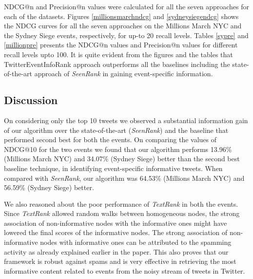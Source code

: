 NDCG@n and Precision@n values were calculated for all the seven approaches for each of the datasets. Figures \ref{millionsmarchndcg} and \ref{sydneysiegendcg} shows the NDCG curves for all the seven approaches on the Millions March NYC and the Sydney Siege events, respectively, for up-to 20 recall levels. Tables \ref{sypre} and \ref{millionpre} presents the NDCG@n values and Precision@n values for different recall levels upto 100. It is quite evident from the figures and the tables that TwitterEventInfoRank approach outperforms all the baselines including the state-of-the-art approach of \textit{SeenRank} in gaining event-specific information.



%




\subsection{Discussion}
On considering only the top 10 tweets we observed a substantial information gain of our algorithm over the state-of-the-art (\textit{SeenRank}) and the baseline that performed second best for both the events. On comparing the values of NDCG@10 for the two events we found that our algorithm performs 13.96\% (Millions March NYC) and 34.07\% (Sydney Siege) better than the second best baseline technique, in identifying event-specific informative tweets. When compared with \textit{SeenRank}, our algorithm was 64.53\% (Millions March NYC) and 56.59\% (Sydney Siege) better. 

We also reasoned about the poor performance of \textit{TextRank} in both the events. Since \textit{TextRank} allowed random walks between homogeneous nodes, the strong association of non-informative nodes with the informative ones might have lowered the final scores of the informative nodes. The strong association of non-informative nodes with informative ones can be attributed to the spamming activity as already explained earlier in the paper. This also proves that our framework is robust against spams and is very effective in retrieving the most informative content related to events from the noisy stream of tweets in Twitter. 

